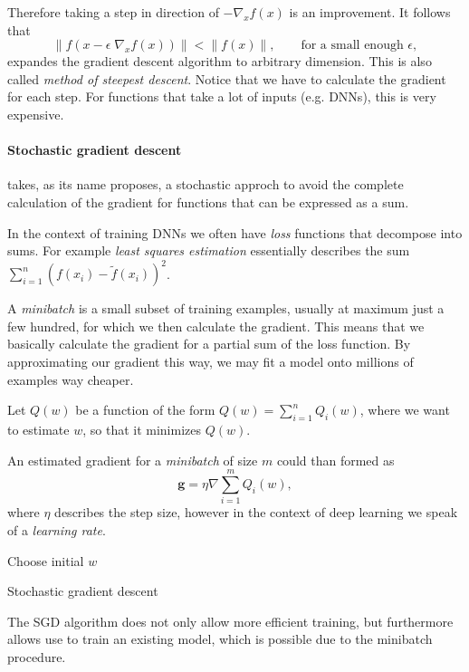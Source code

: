 Therefore taking a step in direction of \(-\nabla_x f(x)\) is an improvement.
It follows that
\begin{equation}
    \lVert f(x - \epsilon \; \nabla_x f(x)) \rVert < \lVert f(x) \rVert, \qquad \text{for a small enough } \epsilon,
\end{equation}
expandes the gradient descent algorithm to arbitrary dimension. This is also called \emph{method of steepest descent}.
Notice that we have to calculate the gradient for each step.
For functions that take a lot of inputs (e.g. DNNs), this is very expensive.

\paragraph{Stochastic gradient descent} takes, as its name proposes, a stochastic approch to avoid the complete calculation of the gradient for functions that can be expressed as a sum.

In the context of training DNNs we often have \emph{loss} functions that decompose into sums.
For example \emph{least squares estimation} essentially describes the sum \(\sum^{n}_{i = 1} (f(x_i) - \tilde{f}(x_i))^2\).

A \emph{minibatch} is a small subset of training examples, usually at maximum just a few hundred, for which we then calculate the gradient.
This means that we basically calculate the gradient for a partial sum of the loss function.
By approximating our gradient this way, we may fit a model onto millions of examples way cheaper. 

Let \(Q(w)\) be a function of the form \(Q(w) = \sum^{n}_{i = 1} Q_i(w)\), where we want to estimate \(w\), so that it minimizes \(Q(w)\).

An estimated gradient for a \emph{minibatch} of size \(m\) could than formed as
\begin{equation}
    \boldsymbol{g} = \eta \nabla \sum^{m}_{i = 1} Q_i(w),
\end{equation}
where \(\eta\) describes the step size, however in the context of deep learning we speak of a \emph{learning rate}.

\begin{algorithm}[H]
    \BlankLine
    Choose initial $w$\;
    \caption{Stochastic gradient descent}
\end{algorithm}
The SGD algorithm does not only allow more efficient training, but furthermore allows use to train an existing model, which is possible due to the minibatch procedure.
